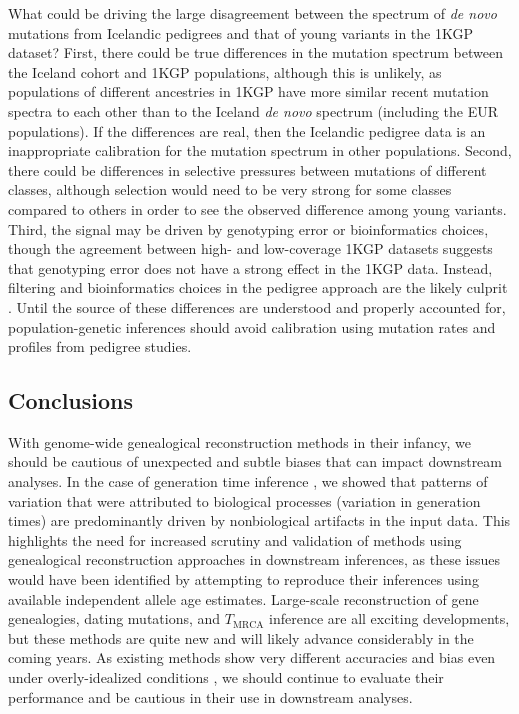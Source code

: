 \documentclass[]{article}
\begin{document}
What could be driving the large disagreement between the spectrum of \emph{de
novo} mutations from Icelandic pedigrees and that of young variants in the 1KGP
dataset? First, there could be true differences in the mutation spectrum
between the Iceland cohort and 1KGP populations, although this is unlikely, as
populations of different ancestries in 1KGP have more similar recent mutation
spectra to each other than to the Iceland \emph{de novo} spectrum (including
the EUR populations). If the differences are real, then the Icelandic pedigree
data is an inappropriate calibration for the mutation spectrum in other
populations. Second, there could be differences in selective pressures between
mutations of different classes, although selection would need to be very strong
for some classes compared to others in order to see the observed difference
among young variants. Third, the signal may be driven by genotyping error or
bioinformatics choices, though the agreement between high- and low-coverage
1KGP datasets suggests that genotyping error does not have a strong effect in
the 1KGP data. Instead, filtering and bioinformatics choices in the pedigree
approach are the likely culprit \citep{bergeron2022mutationathon}. Until the
source of these differences are understood and properly accounted for,
population-genetic inferences should avoid calibration using mutation rates and
profiles from pedigree studies.

\subsection*{Conclusions}

With genome-wide genealogical reconstruction methods in their infancy, we
should be cautious of unexpected and subtle biases that can impact downstream
analyses. In the case of generation time inference \citep{wang2023human}, we
showed that patterns of variation that were attributed to biological processes
(variation in generation times) are predominantly driven by nonbiological
artifacts in the input data. This highlights the need for increased scrutiny
and validation of methods using genealogical reconstruction approaches in
downstream inferences, as these issues would have been identified by attempting
to reproduce their inferences using available independent allele age estimates.
Large-scale reconstruction of gene genealogies, dating mutations, and
$T_\text{MRCA}$ inference are all exciting developments, but these methods are
quite new and will likely advance considerably in the coming years. As existing
methods show very different accuracies and bias even under overly-idealized
conditions \citep{brandt2022evaluation}, we should continue to evaluate their
performance and be cautious in their use in downstream analyses.



\end{document}
